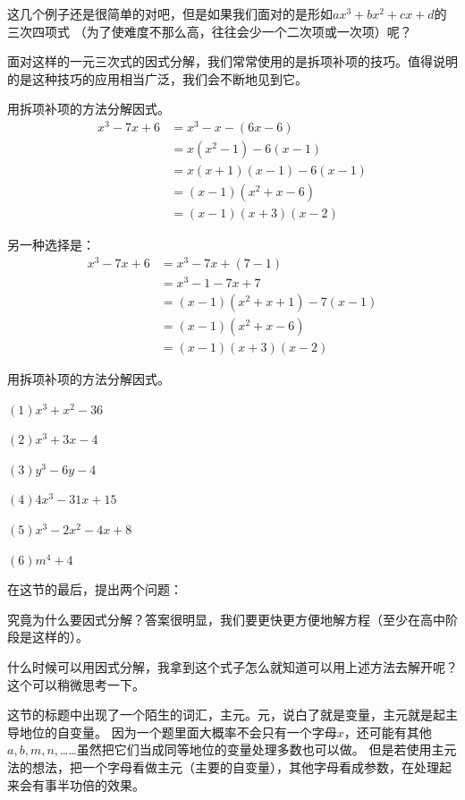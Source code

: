 这几个例子还是很简单的对吧，但是如果我们面对的是形如$ax^3+bx^2+cx+d$的三次四项式
（为了使难度不那么高，往往会少一个二次项或一次项）呢？

面对这样的一元三次式的因式分解，我们常常使用的是拆项补项的技巧。值得说明的是这种技巧的应用相当广泛，我们会不断地见到它。

\begin{example}
用拆项补项的方法分解因式。  
\begin{align*}
    x^3-7x+6&=x^3-x-(6x-6)\\
            &=x(x^2-1)-6(x-1)\\
            &=x(x+1)(x-1)-6(x-1)\\ 
            &=(x-1)(x^2+x-6)\\  
            &=(x-1)(x+3)(x-2)
\end{align*}%

另一种选择是：
\begin{align*}
    x^3-7x+6&=x^3-7x+(7-1)\\
            &=x^3-1-7x+7\\
            &=(x-1)(x^2+x+1)-7(x-1)\\
            &=(x-1)(x^2+x-6)\\  
            &=(x-1)(x+3)(x-2)
\end{align*}
\end{example}

\begin{exercise}
    用拆项补项的方法分解因式。  


$(1)x^3+x^2-36$

$(2)x^3+3x-4$

$(3)y^3-6y-4$

$(4)4x^3-31x+15$

$(5)x^3-2x^2-4x+8$

$(6)m^4+4$
\end{exercise}

在这节的最后，提出两个问题：

究竟为什么要因式分解？答案很明显，我们要更快更方便地解方程（至少在高中阶段是这样的）。

什么时候可以用因式分解，我拿到这个式子怎么就知道可以用上述方法去解开呢？这个可以稍微思考一下。

这节的标题中出现了一个陌生的词汇，主元。元，说白了就是变量，主元就是起主导地位的自变量。
因为一个题里面大概率不会只有一个字母$x$，还可能有其他$a,b,m,n,$……虽然把它们当成同等地位的变量处理多数也可以做。
但是若使用主元法的想法，把一个字母看做主元（主要的自变量），其他字母看成参数，在处理起来会有事半功倍的效果。

